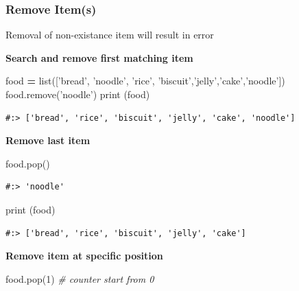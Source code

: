 \documentclass[
]{book}
\newenvironment{Shaded}{\begin{snugshade}}{\end{snugshade}}
\newcommand{\BuiltInTok}[1]{#1}
\newcommand{\CommentTok}[1]{\textcolor[rgb]{0.37,0.37,0.37}{\textit{#1}}}
\newcommand{\DecValTok}[1]{\textcolor[rgb]{0.06,0.06,0.06}{#1}}
\newcommand{\NormalTok}[1]{#1}
\newcommand{\OperatorTok}[1]{\textcolor[rgb]{0.43,0.43,0.43}{\textbf{#1}}}
\newcommand{\StringTok}[1]{\textcolor[rgb]{0.5,0.5,0.5}{#1}}
\begin{document}
\hypertarget{remove-items}{%
\subsubsection{Remove Item(s)}\label{remove-items}}

Removal of non-existance item will result in error

\textbf{Search and remove first matching item}

\begin{Shaded}
\begin{Highlighting}[]
\NormalTok{food }\OperatorTok{=} \BuiltInTok{list}\NormalTok{([}\StringTok{'bread'}\NormalTok{, }\StringTok{'noodle'}\NormalTok{, }\StringTok{'rice'}\NormalTok{, }\StringTok{'biscuit'}\NormalTok{,}\StringTok{'jelly'}\NormalTok{,}\StringTok{'cake'}\NormalTok{,}\StringTok{'noodle'}\NormalTok{])}
\NormalTok{food.remove(}\StringTok{'noodle'}\NormalTok{)}
\BuiltInTok{print}\NormalTok{ (food)}
\end{Highlighting}
\end{Shaded}

\begin{verbatim}
#:> ['bread', 'rice', 'biscuit', 'jelly', 'cake', 'noodle']
\end{verbatim}

\textbf{Remove last item}

\begin{Shaded}
\begin{Highlighting}[]
\NormalTok{food.pop()}
\end{Highlighting}
\end{Shaded}

\begin{verbatim}
#:> 'noodle'
\end{verbatim}

\begin{Shaded}
\begin{Highlighting}[]
\BuiltInTok{print}\NormalTok{ (food)}
\end{Highlighting}
\end{Shaded}

\begin{verbatim}
#:> ['bread', 'rice', 'biscuit', 'jelly', 'cake']
\end{verbatim}

\textbf{Remove item at specific position}

\begin{Shaded}
\begin{Highlighting}[]
\NormalTok{food.pop(}\DecValTok{1}\NormalTok{)  }\CommentTok{# counter start from 0}
\end{Highlighting}
\end{Shaded}
\end{document}
